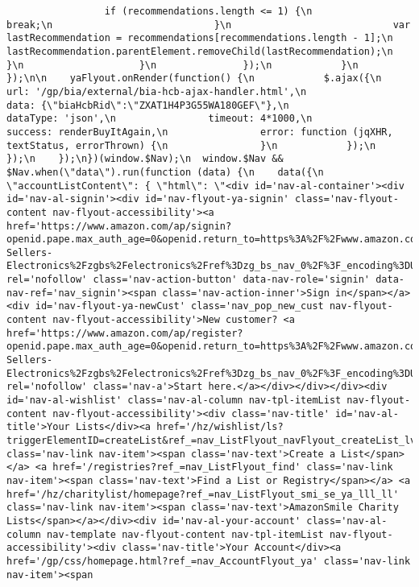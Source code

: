 \documentclass[
]{article}
\begin{document}
\begin{verbatim}
                 if (recommendations.length <= 1) {\n                                break;\n                            }\n                            var lastRecommendation = recommendations[recommendations.length - 1];\n                            lastRecommendation.parentElement.removeChild(lastRecommendation);\n                        }\n                    }\n               });\n            }\n        });\n\n    yaFlyout.onRender(function() {\n            $.ajax({\n                url: '/gp/bia/external/bia-hcb-ajax-handler.html',\n                data: {\"biaHcbRid\":\"ZXAT1H4P3G55WA180GEF\"},\n                dataType: 'json',\n                timeout: 4*1000,\n                success: renderBuyItAgain,\n                error: function (jqXHR, textStatus, errorThrown) {\n                }\n            });\n        });\n    });\n})(window.$Nav);\n  window.$Nav && $Nav.when(\"data\").run(function (data) {\n    data({\n      \"accountListContent\": { \"html\": \"<div id='nav-al-container'><div id='nav-al-signin'><div id='nav-flyout-ya-signin' class='nav-flyout-content nav-flyout-accessibility'><a href='https://www.amazon.com/ap/signin?openid.pape.max_auth_age=0&openid.return_to=https%3A%2F%2Fwww.amazon.com%2FBest-Sellers-Electronics%2Fzgbs%2Felectronics%2Fref%3Dzg_bs_nav_0%2F%3F_encoding%3DUTF8%26ref_%3Dnav_signin&openid.identity=http%3A%2F%2Fspecs.openid.net%2Fauth%2F2.0%2Fidentifier_select&openid.assoc_handle=usflex&openid.mode=checkid_setup&openid.claimed_id=http%3A%2F%2Fspecs.openid.net%2Fauth%2F2.0%2Fidentifier_select&openid.ns=http%3A%2F%2Fspecs.openid.net%2Fauth%2F2.0&' rel='nofollow' class='nav-action-button' data-nav-role='signin' data-nav-ref='nav_signin'><span class='nav-action-inner'>Sign in</span></a><div id='nav-flyout-ya-newCust' class='nav_pop_new_cust nav-flyout-content nav-flyout-accessibility'>New customer? <a href='https://www.amazon.com/ap/register?openid.pape.max_auth_age=0&openid.return_to=https%3A%2F%2Fwww.amazon.com%2FBest-Sellers-Electronics%2Fzgbs%2Felectronics%2Fref%3Dzg_bs_nav_0%2F%3F_encoding%3DUTF8%26ref_%3Dnav_newcust&openid.identity=http%3A%2F%2Fspecs.openid.net%2Fauth%2F2.0%2Fidentifier_select&openid.assoc_handle=usflex&openid.mode=checkid_setup&openid.claimed_id=http%3A%2F%2Fspecs.openid.net%2Fauth%2F2.0%2Fidentifier_select&openid.ns=http%3A%2F%2Fspecs.openid.net%2Fauth%2F2.0&' rel='nofollow' class='nav-a'>Start here.</a></div></div></div><div id='nav-al-wishlist' class='nav-al-column nav-tpl-itemList nav-flyout-content nav-flyout-accessibility'><div class='nav-title' id='nav-al-title'>Your Lists</div><a href='/hz/wishlist/ls?triggerElementID=createList&ref_=nav_ListFlyout_navFlyout_createList_lv_redirect' class='nav-link nav-item'><span class='nav-text'>Create a List</span></a> <a href='/registries?ref_=nav_ListFlyout_find' class='nav-link nav-item'><span class='nav-text'>Find a List or Registry</span></a> <a href='/hz/charitylist/homepage?ref_=nav_ListFlyout_smi_se_ya_lll_ll' class='nav-link nav-item'><span class='nav-text'>AmazonSmile Charity Lists</span></a></div><div id='nav-al-your-account' class='nav-al-column nav-template nav-flyout-content nav-tpl-itemList nav-flyout-accessibility'><div class='nav-title'>Your Account</div><a href='/gp/css/homepage.html?ref_=nav_AccountFlyout_ya' class='nav-link nav-item'><span 
\end{verbatim}
\end{document}
